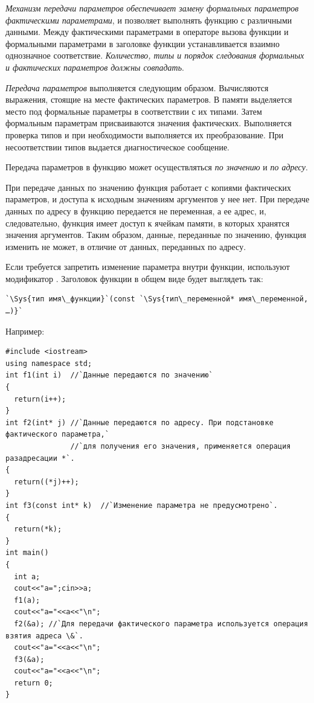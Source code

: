 \emph{Механизм передачи параметров обеспечивает замену формальных параметров фактическими параметрами}, и
позволяет выполнять функцию с различными данными. Между фактическими параметрами в операторе вызова функции и
формальными параметрами в заголовке функции устанавливается взаимно однозначное соответствие.
\emph{Количество, типы и порядок следования формальных и фактических параметров должны совпадать}.

\emph{Передача параметров} выполняется следующим образом. Вычисляются выражения,
стоящие на месте фактических параметров. В памяти выделяется место под формальные параметры в соответствии с их
типами. Затем формальным параметрам присваиваются значения фактических. Выполняется проверка типов и при необходимости
выполняется их преобразование. При несоответствии типов выдается диагностическое сообщение. 

Передача параметров в функцию может осуществляться \emph{по
значению} и \emph{по адресу}. 

При передаче данных по значению функция работает с копиями фактических параметров, и доступа к исходным значениям
аргументов у нее нет. При передаче данных по адресу в функцию передается не переменная, а ее адрес, и, следовательно,
функция имеет доступ к ячейкам памяти, в которых хранятся значения аргументов. Таким образом, данные, переданные по
значению, функция изменить не может, в отличие от данных, переданных по адресу. 

Если требуется запретить изменение параметра внутри функции, используют модификатор . Заголовок
функции в общем виде будет выглядеть так:
\begin{lstlisting}
`\Sys{тип имя\_функции}`(const `\Sys{тип\_переменной* имя\_переменной, …)}`
\end{lstlisting}

Например:
\begin{lstlisting}
#include <iostream>
using namespace std;
int f1(int i)  //`Данные передаются по значению`
{
  return(i++);
}
int f2(int* j) //`Данные передаются по адресу. При подстановке фактического параметра,` 
               //`для получения его значения, применяется операция разадресации *`.
{
  return((*j)++);
}
int f3(const int* k)  //`Изменение параметра не предусмотрено`.
{
  return(*k);
}
int main()
{
  int a;
  cout<<"a=";cin>>a;
  f1(a);
  cout<<"a="<<a<<"\n";
  f2(&a); //`Для передачи фактического параметра используется операция взятия адреса \&`.
  cout<<"a="<<a<<"\n";
  f3(&a);
  cout<<"a="<<a<<"\n";
  return 0;
}
\end{lstlisting}

